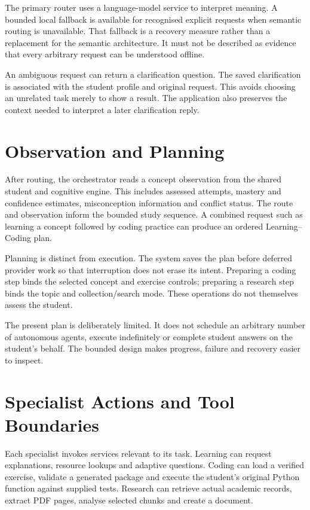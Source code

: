 The primary router uses a language-model service to interpret meaning. A bounded local fallback is available for recognised explicit requests when semantic routing is unavailable. That fallback is a recovery measure rather than a replacement for the semantic architecture. It must not be described as evidence that every arbitrary request can be understood offline.

An ambiguous request can return a clarification question. The saved clarification is associated with the student profile and original request. This avoids choosing an unrelated task merely to show a result. The application also preserves the context needed to interpret a later clarification reply.

\section{Observation and Planning}
After routing, the orchestrator reads a concept observation from the shared student and cognitive engine. This includes assessed attempts, mastery and confidence estimates, misconception information and conflict status. The route and observation inform the bounded study sequence. A combined request such as learning a concept followed by coding practice can produce an ordered Learning--Coding plan.

Planning is distinct from execution. The system saves the plan before deferred provider work so that interruption does not erase its intent. Preparing a coding step binds the selected concept and exercise controls; preparing a research step binds the topic and collection/search mode. These operations do not themselves assess the student.

The present plan is deliberately limited. It does not schedule an arbitrary number of autonomous agents, execute indefinitely or complete student answers on the student's behalf. The bounded design makes progress, failure and recovery easier to inspect.

\section{Specialist Actions and Tool Boundaries}
Each specialist invokes services relevant to its task. Learning can request explanations, resource lookups and adaptive questions. Coding can load a verified exercise, validate a generated package and execute the student's original Python function against supplied tests. Research can retrieve actual academic records, extract PDF pages, analyse selected chunks and create a document.

